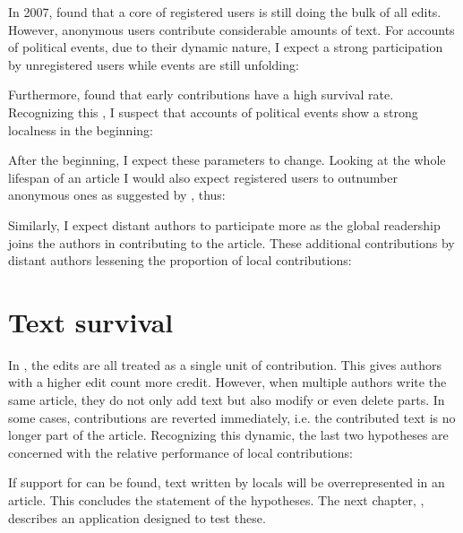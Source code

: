 In 2007, \textcite{kittur2007power} found that a core of registered users is still doing the bulk of all edits.
However, anonymous users contribute considerable amounts of text. 
For accounts of political events, due to their dynamic nature, I expect a strong participation by unregistered users while events are still unfolding:


Furthermore, \textcite{viegas2004history} found that early contributions have a high survival rate.
Recognizing this , I suspect that accounts of political events show a strong localness in the beginning:


After the beginning, I expect these parameters to change.
Looking at the whole lifespan of an article I would also expect registered users to outnumber anonymous ones as suggested by \textcite{kittur2007power}, thus:


Similarly, I expect distant authors to participate more as the global readership joins the authors in contributing to the article.
These additional contributions by distant authors lessening the proportion of local contributions:



\section{Text survival}\label{sec:textsurvival}

In , the edits are all treated as a single unit of contribution.
This gives authors with a higher edit count more credit.
However, when multiple authors write the same article, they do not only add text but also modify or even delete parts.
In some cases, contributions are reverted immediately, i.e. the contributed text is no longer part of the article.
Recognizing this dynamic, the last two hypotheses are concerned with the relative performance of local contributions:



If support for  can be found, text written by locals will be overrepresented in an article.
This concludes the statement of the hypotheses.
The next chapter, , describes an application designed to test these.